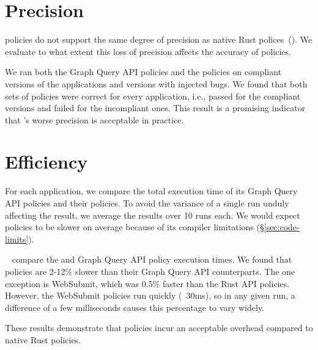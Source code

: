 \section{Precision}
\label{sec:precision}
\syslang{} policies do not support the same degree of precision as native Rust polices~().
%
We evaluate to what extent this loss of precision affects the accuracy of \syslang{} policies.

We ran both the Graph Query API policies and the \syslang{} policies on compliant versions of the applications and 
versions with injected bugs.
%
We found that both sets of policies were correct for every application,
i.e., passed for the compliant versions and failed for the incompliant ones.
%
This result is a promising indicator that \syslang's worse precision is acceptable in practice.

\section{Efficiency}
\label{sec:efficiency}
For each application, we compare the total execution time of its Graph Query API policies
and their \syslang{} policies.
%
To avoid the variance of a single run unduly affecting the result, we average the results over 10 runs each.
%
We would expect \syslang{} policies to be slower on average because of its compiler limitations (\S\ref{sec:code-limits}).

~ compare the \syslang{} and Graph Query API policy execution times.
%
We found that \syslang{} policies are 2-12\% slower than their Graph Query API counterparts.
%
The one exception is WebSubmit, which was 0.5\% faster than the Rust API policies.
%
However, the WebSubmit policies run quickly (~30ms),
so in any given run, a difference of a few milliseconds causes this percentage to vary widely.

These results demonstrate that \syslang{} policies incur an acceptable overhead compared to native Rust policies.

